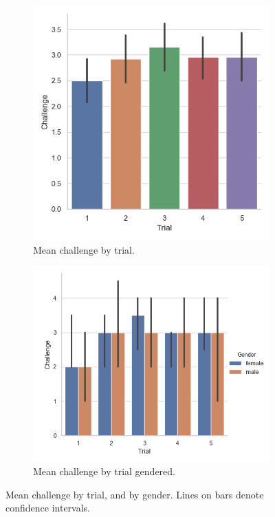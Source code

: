 \begin{figure}[H]
 \begin{subfigure}[b]{0.5\textwidth}
     \centering
     \includegraphics[scale=0.5]{Files/Plots/challenge_by_trial_mean.png}
     \caption{Mean challenge by trial.}
     \label{fig:meanChal}
 \end{subfigure}
  \begin{subfigure}[b]{0.5\textwidth}
     \centering
     \includegraphics[scale=0.5]{Files/Plots/challenge_by_trial_mean_gen.png}
     \caption{Mean challenge by trial gendered.}
     \label{fig:fig:meanChalGen}
 \end{subfigure}
     \caption{Mean challenge by trial, and by gender. Lines on bars denote confidence intervals.}
    \label{fig:chalByCond}
\end{figure}

